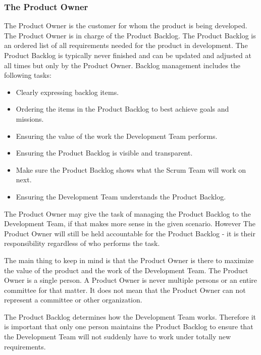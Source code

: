 \subsubsection{The Product Owner}

The Product Owner is the customer for whom the product is being developed.
The Product Owner is in charge of the Product Backlog\cite{scrumguide11}. The
Product Backlog is an ordered list of all requirements needed for the product in
development. The Product Backlog is typically never finished and can be updated 
and adjusted at all times but only by the Product
Owner\cite{scrumguide11}. Backlog management includes the following tasks:

\begin{itemize}
	\item Clearly expressing backlog items.
	\item	Ordering the items in the Product Backlog to best achieve goals and missions.
	\item	Ensuring the value of the work the Development Team performs.
	\item	Ensuring the Product Backlog is visible and transparent.
	\item	Make sure the Product Backlog shows what the Scrum Team will work on next.
	\item	Ensuring the Development Team understands the Product
	Backlog.\cite{scrumguide11}
\end{itemize}

The Product Owner may give the task of managing the Product Backlog to the
Development Team, if that makes more sense in the given
scenario\cite{scrumguide11}. However The Product Owner will still be held
 accountable for the Product Backlog - it is their responsibility regardless of who
performs the task\cite{scrumguide11}.


The main thing to keep in mind is that the Product Owner is there to maximize the value of
the product and the work of the Development Team\cite{scrumguide11}.  The Product Owner is a
single person. A Product Owner is never multiple persons or an entire committee for that
matter. It does not mean that the Product Owner can not represent a committee or
other organization\cite{scrumguide11}.


The Product Backlog determines how the Development Team works. Therefore it is important
that only one person maintains the Product Backlog to ensure that the Development Team will
not suddenly have to work under totally new requirements\cite{scrumguide11}.